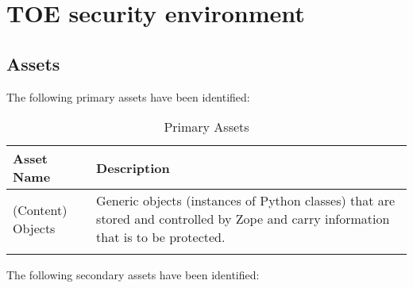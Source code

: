 \documentclass[12pt,english]{scrbook}
\begin{document}

\chapter{TOE security environment}


\section{Assets}

The following primary assets have been identified:

\begin{longtable}[c]{lp{10cm}}
  \toprule 
  Asset Name & Description \\
  \midrule\endhead

  (Content) Objects & 
  Generic objects (instances of Python classes) that
  are stored and controlled by Zope and carry
  information that is to be protected. \\
  \bottomrule
  \caption{Primary Assets}
  \label{tab-assets}
\end{longtable}

The following secondary assets have been identified:
\end{document}
